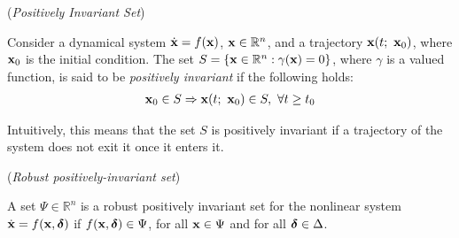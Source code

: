   \begin{definition} (\textit{Positively Invariant Set})
    \label{def:positively_invariant}

    Consider a dynamical system $\dot{\bm{\mathbf{x}}} = f(\bm{\mathbf{x}})$,
    $\bm{\mathbf{x}} \in \mathbb{R}^n$, and a trajectory $\bm{\mathbf{x}}(t;\ \bm{\mathbf{x}}_0)$,
    where $\bm{\mathbf{x}}_0$ is the initial condition. The set
    $S = \{\bm{\mathbf{x}} \in \mathbb{R}^n : \gamma(\bm{\mathbf{x}}) = 0\}$, where
    $\gamma$ is a valued function, is said to be \textit{positively invariant}
    if the following holds:
    \begin{align}
      \vect{x}_0 \in S \Rightarrow \vect{x}(t;\ \vect{x}_0) \in S,\ \forall t \geq t_0
    \end{align}

    Intuitively, this means that the set $S$ is positively invariant if a
    trajectory of the system does not exit it once it enters it. \\[2.5ex]
  \end{definition}


\begin{definition}\cite{ISS_SKATOLINI} (\textit{Robust positively-invariant set})
\label{def:robust_positively_invariant_set}

A set $\Psi \in \mathbb{R}^n$ is a robust positively invariant set for the
nonlinear system $\dot{\bm{\mathbf{x}}} = f(\bm{\mathbf{x}}, \bm{\mathbf{\delta}})$ if
$f(\bm{\mathbf{x}}, \bm{\mathbf{\delta}}) \in \Psi$, for all $\bm{\mathbf{x}} \in \Psi$ and for all
$\bm{\mathbf{\delta}} \in \Delta$.
\\[2.5ex]
\end{definition}
